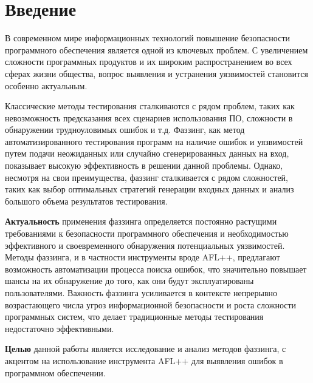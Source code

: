 \chapter*{Введение} %

В современном мире информационных технологий повышение безопасности программного обеспечения является одной из ключевых проблем. С увеличением сложности программных продуктов и их широким распространением во всех сферах жизни общества, вопрос выявления и устранения уязвимостей становится особенно актуальным. 

Классические методы тестирования сталкиваются с рядом проблем, таких как невозможность предсказания всех сценариев использования ПО, сложности в обнаружении трудноуловимых ошибок и т.д. Фаззинг, как метод автоматизированного тестирования программ на наличие ошибок и уязвимостей путем подачи неожиданных или случайно сгенерированных данных на вход, показывает высокую эффективность в решении данной проблемы. Однако, несмотря на свои преимущества, фаззинг сталкивается с рядом сложностей, таких как выбор оптимальных стратегий генерации входных данных и анализ большого объема результатов тестирования.
\par

\textbf{Актуальность} применения фаззинга определяется постоянно растущими требованиями к безопасности программного обеспечения и необходимостью эффективного и своевременного обнаружения потенциальных уязвимостей. Методы фаззинга, и в частности инструменты вроде AFL++, предлагают возможность автоматизации процесса поиска ошибок, что значительно повышает шансы на их обнаружение до того, как они будут эксплуатированы пользователями. Важность фаззинга усиливается в контексте непрерывно возрастающего числа угроз информационной безопасности и роста сложности программных систем, что делает традиционные методы тестирования недостаточно эффективными.
\par

\textbf{Целью} данной работы является исследование и анализ методов фаззинга, с акцентом на использование инструмента AFL++ для выявления ошибок в программном обеспечении. %

